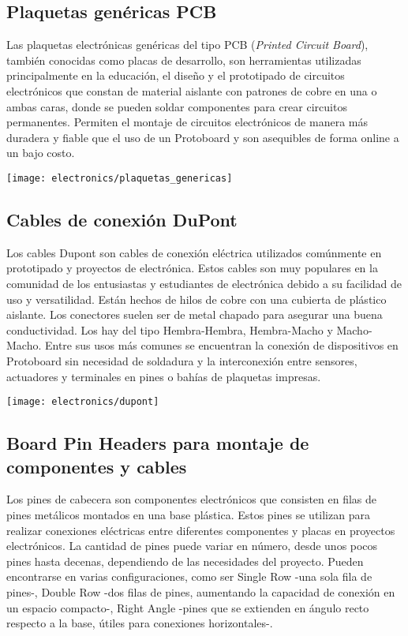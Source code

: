 \subsection{Plaquetas genéricas PCB}
Las plaquetas electrónicas genéricas del tipo PCB (\textit{Printed Circuit Board}), también conocidas como placas de desarrollo, son herramientas utilizadas principalmente en la educación, el diseño y el prototipado de circuitos electrónicos que constan de material aislante con patrones de cobre en una o ambas caras, donde se pueden soldar componentes para crear circuitos permanentes. Permiten el montaje de circuitos electrónicos de manera más duradera y fiable que el uso de un Protoboard y son asequibles de forma online a un bajo costo.

\begin{center}
  \centering
  \texttt{[image: electronics/plaquetas\_genericas]}
  \label{fig:plaquetas_genericas}
\end{center}


\subsection{Cables de conexión DuPont}
Los cables Dupont son cables de conexión eléctrica utilizados comúnmente en prototipado y proyectos de electrónica. Estos cables son muy populares en la comunidad de los entusiastas y estudiantes de electrónica debido a su facilidad de uso y versatilidad. Están hechos de hilos de cobre con una cubierta de plástico aislante. Los conectores suelen ser de metal chapado para asegurar una buena conductividad. Los hay del tipo Hembra-Hembra, Hembra-Macho y Macho-Macho. Entre sus usos más comunes se encuentran la conexión de dispositivos en Protoboard sin necesidad de soldadura y la interconexión entre sensores, actuadores y terminales en pines o bahías de plaquetas impresas.

\begin{center}
  \centering
  \texttt{[image: electronics/dupont]}
  \label{fig:dupont}
\end{center}

\subsection{Board Pin Headers para montaje de componentes y cables}
Los pines de cabecera son componentes electrónicos que consisten en filas de pines metálicos montados en una base plástica. Estos pines se utilizan para realizar conexiones eléctricas entre diferentes componentes y placas en proyectos electrónicos. La cantidad de pines puede variar en número, desde unos pocos pines hasta decenas, dependiendo de las necesidades del proyecto. Pueden encontrarse en varias configuraciones, como ser Single Row -una sola fila de pines-, Double Row -dos filas de pines, aumentando la capacidad de conexión en un espacio compacto-, Right Angle -pines que se extienden en ángulo recto respecto a la base, útiles para conexiones horizontales-.

